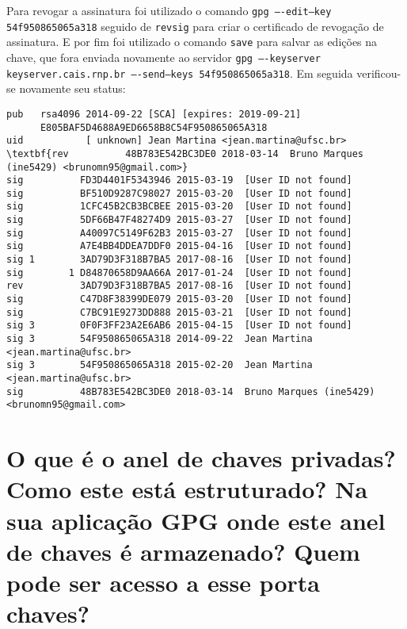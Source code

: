 \documentclass[
    article,            %
    11pt,               %
    oneside,            %
    a4paper,            %
    english,            %
    brazil,             %
    sumario=tradicional,
    ]{abntex2}
\begin{document}
Para revogar a assinatura foi utilizado o comando \texttt{gpg ----edit--key 54f950865065a318} seguido de \texttt{revsig} para criar o certificado de revogação de assinatura. E por fim foi utilizado o comando \texttt{save} para salvar as edições na chave, que fora enviada novamente ao servidor \texttt{gpg ----keyserver keyserver.cais.rnp.br ----send--keys 54f950865065a318}. Em seguida verificou-se novamente seu status:

\begin{Verbatim}[frame=single, commandchars=\\\{\}, fontsize=\footnotesize]
pub   rsa4096 2014-09-22 [SCA] [expires: 2019-09-21]
      E805BAF5D4688A9ED6658B8C54F950865065A318
uid           [ unknown] Jean Martina <jean.martina@ufsc.br>
\textbf{rev          48B783E542BC3DE0 2018-03-14  Bruno Marques (ine5429) <brunomn95@gmail.com>}
sig          FD3D4401F5343946 2015-03-19  [User ID not found]
sig          BF510D9287C98027 2015-03-20  [User ID not found]
sig          1CFC45B2CB3BCBEE 2015-03-20  [User ID not found]
sig          5DF66B47F48274D9 2015-03-27  [User ID not found]
sig          A40097C5149F62B3 2015-03-27  [User ID not found]
sig          A7E4BB4DDEA7DDF0 2015-04-16  [User ID not found]
sig 1        3AD79D3F318B7BA5 2017-08-16  [User ID not found]
sig        1 D84870658D9AA66A 2017-01-24  [User ID not found]
rev          3AD79D3F318B7BA5 2017-08-16  [User ID not found]
sig          C47D8F38399DE079 2015-03-20  [User ID not found]
sig          C7BC91E9273DD888 2015-03-21  [User ID not found]
sig 3        0F0F3FF23A2E6AB6 2015-04-15  [User ID not found]
sig 3        54F950865065A318 2014-09-22  Jean Martina <jean.martina@ufsc.br>
sig 3        54F950865065A318 2015-02-20  Jean Martina <jean.martina@ufsc.br>
sig          48B783E542BC3DE0 2018-03-14  Bruno Marques (ine5429) <brunomn95@gmail.com>
\end{Verbatim}



\section{O que é o anel de chaves privadas? Como este está estruturado? Na sua aplicação GPG onde este anel de chaves é armazenado? Quem pode ser acesso a esse porta chaves?}


\end{document}
